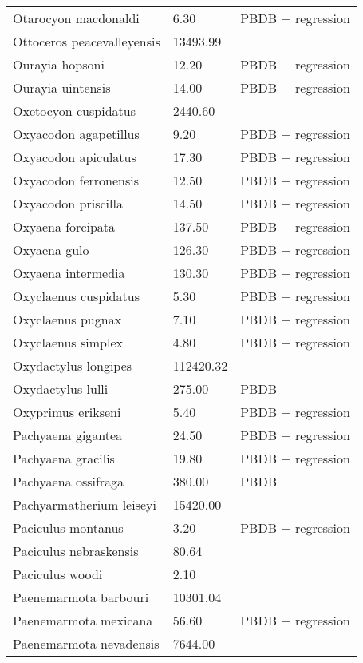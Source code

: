 \documentclass{article}
\begin{document}
\begin{center}
\begin{longtable}{p{} p{} p{}}
    Otarocyon macdonaldi & 6.30 & PBDB + regression \\ 
    Ottoceros peacevalleyensis & 13493.99 & \cite{Tomiya2013} \\ 
    Ourayia hopsoni & 12.20 & PBDB + regression \\ 
    Ourayia uintensis & 14.00 & PBDB + regression \\ 
    Oxetocyon cuspidatus & 2440.60 & \cite{Tomiya2013} \\ 
    Oxyacodon agapetillus & 9.20 & PBDB + regression \\ 
    Oxyacodon apiculatus & 17.30 & PBDB + regression \\ 
    Oxyacodon ferronensis & 12.50 & PBDB + regression \\ 
    Oxyacodon priscilla & 14.50 & PBDB + regression \\ 
    Oxyaena forcipata & 137.50 & PBDB + regression \\ 
    Oxyaena gulo & 126.30 & PBDB + regression \\ 
    Oxyaena intermedia & 130.30 & PBDB + regression \\ 
    Oxyclaenus cuspidatus & 5.30 & PBDB + regression \\ 
    Oxyclaenus pugnax & 7.10 & PBDB + regression \\ 
    Oxyclaenus simplex & 4.80 & PBDB + regression \\ 
    Oxydactylus longipes & 112420.32 & \cite{Tomiya2013} \\ 
    Oxydactylus lulli & 275.00 & PBDB \\ 
    Oxyprimus erikseni & 5.40 & PBDB + regression \\ 
    Pachyaena gigantea & 24.50 & PBDB + regression \\ 
    Pachyaena gracilis & 19.80 & PBDB + regression \\ 
    Pachyaena ossifraga & 380.00 & PBDB \\ 
    Pachyarmatherium leiseyi & 15420.00 & \cite{McDonald2005} \\ 
    Paciculus montanus & 3.20 & PBDB + regression \\ 
    Paciculus nebraskensis & 80.64 & \cite{Tomiya2013} \\ 
    Paciculus woodi & 2.10 & \cite{Korth1993} \\ 
    Paenemarmota barbouri & 10301.04 & \cite{Tomiya2013} \\ 
    Paenemarmota mexicana & 56.60 & PBDB + regression \\ 
    Paenemarmota nevadensis & 7644.00 & \cite{McKenna2011} \\ 

\end{longtable}
\end{center}
\end{document}
